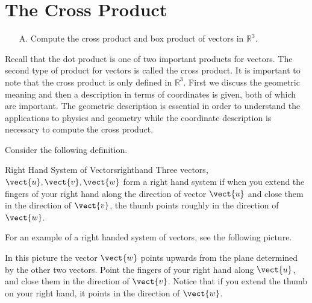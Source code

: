 \section{The Cross Product}

\begin{outcome}

\begin{enumerate}

\item[A.] Compute the cross product and box product of vectors in $\mathbb{R}^3$.
\end{enumerate}
\end{outcome}

Recall that the dot product is one of two important products for vectors. The second type of product for vectors is called the cross product. It is important to note that the 
cross product is only defined in $\mathbb{R}^{3}.$ 
First we discuss the geometric meaning and then a description in terms of
coordinates is given, both of which are important. 
The geometric description is essential in order to understand the
applications to physics and geometry while the coordinate description is necessary to compute the cross product.

Consider the following definition.

\begin{definition}{Right Hand System of Vectors}{righthand}
Three vectors, $\vect{u},\vect{v},\vect{w}$ form a right hand system if when you
extend the fingers of your right hand along the direction of vector $\vect{u}$ and
close them in the direction of $\vect{v}$, the thumb points roughly in the
direction of $\vect{w}$.
\end{definition}

For an example of a right handed system of vectors, see the following
picture.

\begin{center}
\end{center}

In this picture the vector $\vect{w}$ points upwards from the plane
determined by the other two vectors. Point the fingers of your right hand along $\vect{u}$, and 
close them in the direction of $\vect{v}$. Notice that if you extend the thumb on your right hand,
it points in the direction of $\vect{w}$.

